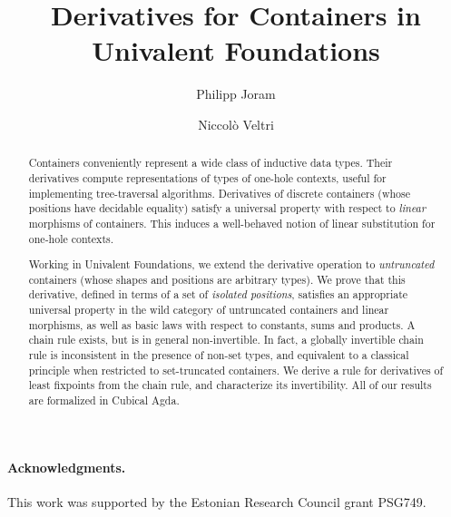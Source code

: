 \documentclass[a4paper]{article}
\title{Derivatives for Containers in Univalent Foundations}
\author{Philipp Joram}
\author{Niccol{\`o} Veltri}
\affil{Tallinn University of Technology, Estonia}
\date{}
\begin{document}
\maketitle

\begin{abstract}
  Containers conveniently represent a wide class of inductive data types.
  Their derivatives compute representations of types of one-hole contexts,
  useful for implementing tree-traversal algorithms.
  Derivatives of discrete containers (whose positions have decidable equality) satisfy a universal property with respect to \emph{linear} morphisms of containers.
  This induces a well-behaved notion of linear substitution for one-hole contexts.

  Working in Univalent Foundations, we extend the derivative operation to \emph{untruncated} containers (whose shapes and positions are arbitrary types).
  We prove that this derivative, defined in terms of a set of \emph{isolated positions},
  satisfies an appropriate universal property in the wild category of untruncated containers and linear morphisms,
  as well as basic laws with respect to constants, sums and products.
  A chain rule exists, but is in general non-invertible.
  In fact, a globally invertible chain rule is inconsistent in the presence of non-set types,
  and equivalent to a classical principle when restricted to set-truncated containers.
  We derive a rule for derivatives of least fixpoints from the chain rule,
  and characterize its invertibility.
  All of our results are formalized in Cubical Agda.
\end{abstract}









\paragraph{Acknowledgments.}
This work was supported by the Estonian Research Council grant PSG749.

\printbibliography
\end{document}
